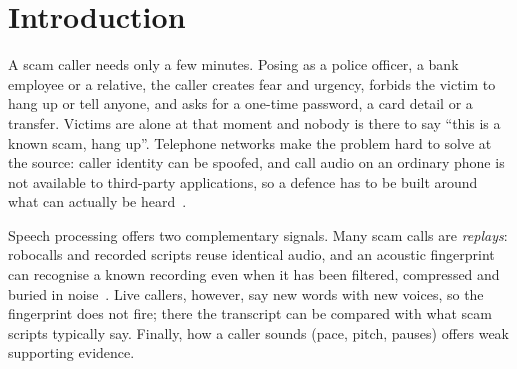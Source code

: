 \documentclass[letterpaper,12pt]{article}
\begin{document}
\begin{abstract}
Phone scams such as ``digital arrest'', fake KYC and OTP requests, lottery fees and ``relative in trouble'' calls work because the victim is frightened, rushed and alone. We built ScamShield Voice, a web application that listens to a call, either an uploaded recording or a live microphone stream, and decides whether it is likely a scam, shows the evidence, and speaks to the user. Detection has three layers. The first is an acoustic fingerprint written from scratch in NumPy and SciPy: spectral peaks in the telephone band are paired into hashes and matched against known scam recordings by the spike they form in an offset histogram. It recognised every known recording through telephone filtering, a GSM codec, noise down to 5~dB and $\pm$5\% speed change, with no false matches on 1\,459 legitimate or unrelated clips. The second layer transcribes speech with Whisper and scores the wording with a TF-IDF logistic regression trained on 612 generated scam and genuine scripts in English and Hinglish. The third layer measures pitch, energy and pauses. A noisy-OR fusion produces a 0--100 risk with reasons, and a voice assistant grounded only in that evidence answers questions. On a locked test set written by a different generator model, the system caught 92.3\% of scam clips with 1.8\% false alarms. Our evaluation also exposed two weaknesses that we report: a first version caught only 11\% of reworded scams on a hand-written holdout, and live streaming still raises false alerts on a third of genuine calls.
\end{abstract}

\newpage
\section{Introduction}
A scam caller needs only a few minutes. Posing as a police officer, a bank employee or a relative, the caller creates fear and urgency, forbids the victim to hang up or tell anyone, and asks for a one-time password, a card detail or a transfer. Victims are alone at that moment and nobody is there to say ``this is a known scam, hang up''. Telephone networks make the problem hard to solve at the source: caller identity can be spoofed, and call audio on an ordinary phone is not available to third-party applications, so a defence has to be built around what can actually be heard~\cite{tu2016sok}.

Speech processing offers two complementary signals. Many scam calls are \emph{replays}: robocalls and recorded scripts reuse identical audio, and an acoustic fingerprint can recognise a known recording even when it has been filtered, compressed and buried in noise~\cite{wang2003shazam,haitsma2002fingerprint}. Live callers, however, say new words with new voices, so the fingerprint does not fire; there the transcript can be compared with what scam scripts typically say. Finally, how a caller sounds (pace, pitch, pauses) offers weak supporting evidence.
\end{document}

